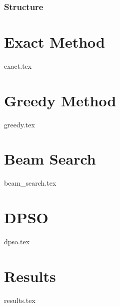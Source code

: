 \documentclass{beamer}
\begin{document}
    \begin{frame}
        \titlepage
    \end{frame}
    \begin{frame}
        \frametitle{Structure}
        \tableofcontents
    \end{frame}

    \section{Exact Method}
    {exact.tex}

    \section{Greedy Method}
    {greedy.tex}

    \section{Beam Search}
    {beam_search.tex}

    \section{DPSO}
    {dpso.tex}

    \section{Results}
    {results.tex}
\end{document}
